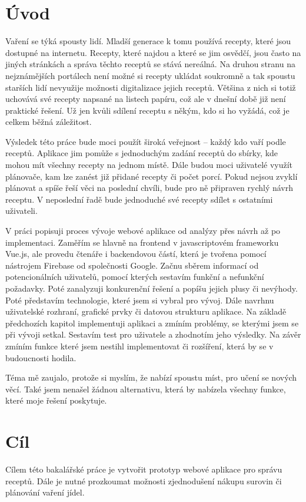 
\chapter{Úvod}

Vaření se týká spousty lidí. Mladší generace k tomu používá recepty, které jsou dostupné na internetu. Recepty, které najdou
a které se jim osvědčí, jsou často na jiných stránkách a správa těchto receptů se stává nereálná. Na druhou stranu na nejznámějších
portálech není možné si recepty ukládat soukromně a tak spoustu starších lidí nevyužije možnosti digitalizace jejich receptů.
Většina z nich si totiž uchovává své recepty napsané na listech papíru, což ale v dnešní době již není praktické řešení. Už jen kvůli
sdílení receptu s někým, kdo si ho vyžádá, což je celkem běžná záležitost.

Výsledek této práce bude moci použít široká veřejnost -- každý kdo vaří podle receptů. Aplikace jim pomůže s jednoduchým
zadání receptů do sbírky, kde mohou mít všechny recepty na jednom místě. Dále budou moci uživatelé využít plánovače, kam
lze zanést již přidané recepty či počet porcí. Pokud nejsou zvyklí plánovat a spíše řeší věci na poslední chvíli, bude
pro ně připraven rychlý návrh receptu. V neposlední řadě bude jednoduché své recepty sdílet s ostatními uživateli.

V práci popisuji proces vývoje webové aplikace od analýzy přes návrh až po implementaci. Zaměřím se hlavně na frontend v
javascriptovém frameworku Vue.js, ale provedu čtenáře i backendovou částí, která je tvořena pomocí nástrojem Firebase od
společnosti Google. Začnu sběrem informací od potencionálních uživatelů, pomocí kterých sestavím funkční a nefunkční požadavky.
Poté zanalyzuji konkurenční řešení a popíšu jejich plusy či nevýhody. Poté představím technologie, které jsem si vybral pro
vývoj. Dále navrhnu uživatelské rozhraní, grafické prvky či datovou strukturu aplikace. Na základě předchozích kapitol implementuji
aplikaci a zmíním problémy, se kterými jsem se při vývoji setkal. Sestavím test pro uživatele a zhodnotím jeho výsledky.
Na závěr zmíním funkce které jsem nestihl implementovat či rozšíření, která by se v budoucnosti hodila.

Téma mě zaujalo, protože si myslím, že nabízí spoustu míst, pro učení se nových věcí. Také jsem nenašel žádnou alternativu,
která by nabízela všechny funkce, které moje řešení poskytuje.

\chapter{Cíl}
Cílem této bakalářské práce je vytvořit prototyp webové aplikace pro správu receptů. Dále je nutné prozkoumat možnosti
zjednodušení nákupu surovin či plánování vaření jídel.

